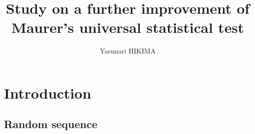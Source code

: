 \documentclass[dvipdfmx,english]{ampmt} %
\title[Study on a further improvement of \\ Maurer's universal statistical test]
      {Study on a further improvement of \\  Maurer's universal statistical test}
\author{Yasunari HIKIMA}
\begin{document}
\ifoutputbody
\makeinsidecover                %
\makeabstract                   %
\maketoc                        %
\setcounter{page}{1}
\section{Introduction}\label{sec:introduction}
\subsection{Random sequence}%

\end{document}

